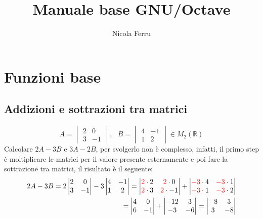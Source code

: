 \documentclass{book}
\title{Manuale base GNU/Octave}
\author{Nicola Ferru}
\begin{document}
\maketitle
\tableofcontents

\chapter{Funzioni base}
\label{chap:funbase}

\section{Addizioni e sottrazioni tra matrici}
\label{sec:addesottmtx}

\begin{equation}
  \label{eq:es1}
  A=
  \begin{vmatrix}
    2 & 0 \\
    3 & -1
  \end{vmatrix}, \text{ } B=
  \begin{vmatrix}
    4 & -1\\
    1 & 2
  \end{vmatrix} \in M_2(\mathds{R})
\end{equation}
Calcolare $2A-3B$ e $3A-2B$, per svolgerlo non è complesso, infatti, il primo
step è moltiplicare le matrici per il valore presente esternamente e poi fare
la sottrazione tra matrici, il risultato è il seguente:
\begin{eqnarray*}
  \label{eq:es1_sv}
  2A-3B = 2 \begin{vmatrix}
    2 & 0 \\
    3 & -1
  \end{vmatrix} - 3\begin{vmatrix}
    4 & -1\\
    1 & 2
  \end{vmatrix}=\begin{vmatrix}
    {\color{red}2}\cdot2 & {\color{red}2}\cdot0 \\
    {\color{red}2}\cdot3 & {\color{red}2}\cdot-1
  \end{vmatrix} +\begin{vmatrix}
    {\color{red}-3}\cdot4 & {\color{red}-3}\cdot1\\
    {\color{red}-3}\cdot1 & {\color{red}-3}\cdot2
                 \end{vmatrix}\\
  =
  \begin{vmatrix}
    4 &0\\
    6 &-1
  \end{vmatrix} +
  \begin{vmatrix}
    -12 & 3\\
    -3 &-6
  \end{vmatrix}=
  \begin{vmatrix}
    -8 & 3\\
    3 & -8
  \end{vmatrix}
\end{eqnarray*}
\end{document}
